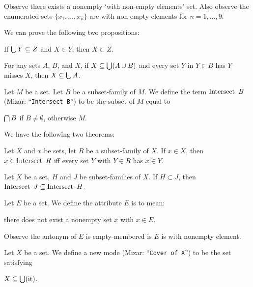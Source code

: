 \documentclass{article}
\begin{document}
Observe there exists a nonempty `with non-empty elements' set.
Also observe the enumerated sets $\{x_{1},\dots,x_{n}\}$ are with
non-empty elements for $n=1,\dots,9$.

We can prove the following two propositions:
\begin{thm}
\item\label{setfam1:41} If $\bigcup Y\subseteq Z$ and $X\in Y$, then
  $X\subset Z$.
\item\label{setfam1:42} For any sets $A$, $B$, and $X$, if
  $X\subseteq\bigcup(A\cup B)$ and every set $Y$ in $Y\in B$ has $Y$ misses $X$,
  then $X\subseteq\bigcup A$.
\end{thm}

\begin{definition}
Let $M$ be a set. Let $B$ be a subset-family of $M$.
We define the term $\operatorname{Intersect}\ B$ (Mizar: ``\verb#Intersect B#'') to be
the subset of $M$ equal to
\begin{defn}
\item $\bigcap B$ if $B\neq\emptyset$, otherwise $M$.
\end{defn}
\end{definition}

We have the following two theorems:
\begin{thm}
\item\label{setfam1:43} Let $X$ and $x$ be sets, let $R$ be a
  subset-family of $X$. If $x\in X$, then $x\in\operatorname{Intersect}\ R$ iff every
  set $Y$ with $Y\in R$ has $x\in Y$.
\item\label{setfam1:44} Let $X$ be a set, $H$ and $J$ be subset-families
  of $X$. If $H\subset J$, then $\Intersect\ J\subset\Intersect\ H$.
\end{thm}

\begin{definition}
Let $E$ be a set. We define the attribute $E$ is 
to mean:
\begin{defn}
\item there does not exist a nonempty set $x$ with $x\in E$.
\end{defn}
\end{definition}

\begin{notation}
Observe the antonym of $E$ is empty-membered is $E$ is with nonempty element.
\end{notation}

\begin{definition}
Let $X$ be a set.
We define a new mode  (Mizar:
``\verb#Cover of X#'') to be the set satisfying
\begin{defn}
\item $X\subseteq\bigcup(\mbox{it})$.
\end{defn}
\end{definition}
\end{document}
